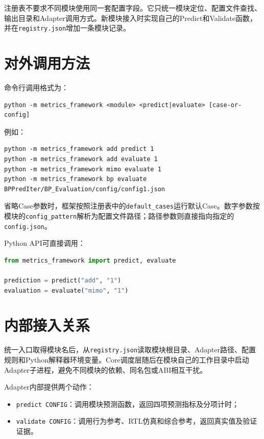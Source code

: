 \documentclass[a4paper,oneside,11pt]{ctexrep}
\begin{document}
注册表不要求不同模块使用同一套配置字段。它只统一模块定位、配置文件查找、输出目录和Adapter调用方式。新模块接入时实现自己的Predict和Validate函数，并在\texttt{registry.json}增加一条模块记录。

\section{对外调用方法}

命令行调用格式为：

\begin{lstlisting}[style=command]
python -m metrics_framework <module> <predict|evaluate> [case-or-config]
\end{lstlisting}

例如：

\begin{lstlisting}[style=command]
python -m metrics_framework add predict 1
python -m metrics_framework add evaluate 1
python -m metrics_framework mimo evaluate 1
python -m metrics_framework bp evaluate BPPredIter/BP_Evaluation/config/config1.json
\end{lstlisting}

省略Case参数时，框架按照注册表中的\texttt{default\_cases}运行默认Case。数字参数按模块的\texttt{config\_pattern}解析为配置文件路径；路径参数则直接指向指定的\texttt{config.json}。

Python API可直接调用：

\begin{lstlisting}[language=Python,style=command]
from metrics_framework import predict, evaluate

prediction = predict("add", "1")
evaluation = evaluate("mimo", "1")
\end{lstlisting}

\section{内部接入关系}

统一入口取得模块名后，从\texttt{registry.json}读取模块根目录、Adapter路径、配置规则和Python解释器环境变量。Core调度层随后在模块自己的工作目录中启动Adapter子进程，避免不同模块的依赖、同名包或ABI相互干扰。

Adapter内部提供两个动作：

\begin{itemize}
    \item \texttt{predict CONFIG}：调用模块预测函数，返回四项预测指标及分项计时；
    \item \texttt{validate CONFIG}：调用行为参考、RTL仿真和综合参考，返回真实值及验证证据。
\end{itemize}
\end{document}
